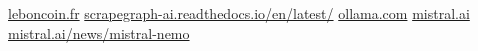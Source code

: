 \documentclass[a4paper, 12pt, twoside]{report}
\begin{document}
\renewcommand{\bibname}{Webographie}
\begin{thebibliography}{2}
    \url{leboncoin.fr}
    \url{scrapegraph-ai.readthedocs.io/en/latest/}
    \url{ollama.com}
    \url{mistral.ai}
    \url{mistral.ai/news/mistral-nemo}
\end{thebibliography}
\end{document}
